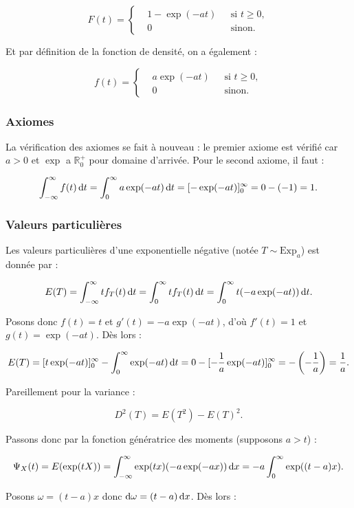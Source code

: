 \documentclass{article}
\begin{document}
		\[F(t) = \left\{\begin{aligned}
			&1-\exp(-at)\,\, &\text{ si $t \geq 0$}, \\
			& 0 &\text{ sinon}.
		\end{aligned}\right.\]

		Et par définition de la fonction de densité, on a également :

		\[f(t) = \left\{\begin{aligned} & a\exp(-at)\,\, &\text{ si $t \geq 0$},\\& 0 &\text{ sinon}.\end{aligned}\right.\]

		\subsubsection{Axiomes}
			La vérification des axiomes se fait à nouveau : le premier axiome est vérifié car $a > 0$ et $\exp$ a $\mathbb R_0^+$ pour domaine d'arrivée. Pour le second axiome,
			il faut :

			\[\int_{-\infty}^\infty f(t)\dif t = \int_0^\infty a\exp(-at)\dif t = [-\exp(-at)]_0^\infty = 0 - (-1) = 1.\]

		\subsubsection{Valeurs particulières}
			Les valeurs particulières d'une exponentielle négative (notée $T \sim \text{Exp}_a$) est donnée par :

			\[E(T) = \int_{-\infty}^\infty tf_T(t)\dif t = \int_0^\infty tf_T(t)\dif t = \int_0^\infty t(-a\exp(-at))\dif t.\]

			Posons donc $f(t) = t$ et $g'(t) = -a\exp(-at)$, d'où $f'(t) = 1$ et $g(t) = \exp(-at)$. Dès lors :

			\[E(T) = [t\exp(-at)]_0^\infty - \int_0^\infty \exp(-at)\dif t = 0 - [-\frac 1a\exp(-at)]_0^\infty = -\left(-\frac 1a\right) = \frac 1a.\]

			Pareillement pour la variance :

			\[D^2(T) = E(T^2)-E(T)^2.\]

			Passons donc par la fonction génératrice des moments (supposons $a > t$) :

			\[\Psi_X(t) = E(\exp(tX)) = \int_{-\infty}^\infty \exp(tx)(-a\exp(-ax))\dif x = -a\int_0^\infty \exp((t-a)x).\]

			Posons $\omega = (t-a)x$ donc $\dif\omega = (t-a)\dif x$. Dès lors :
\end{document}
